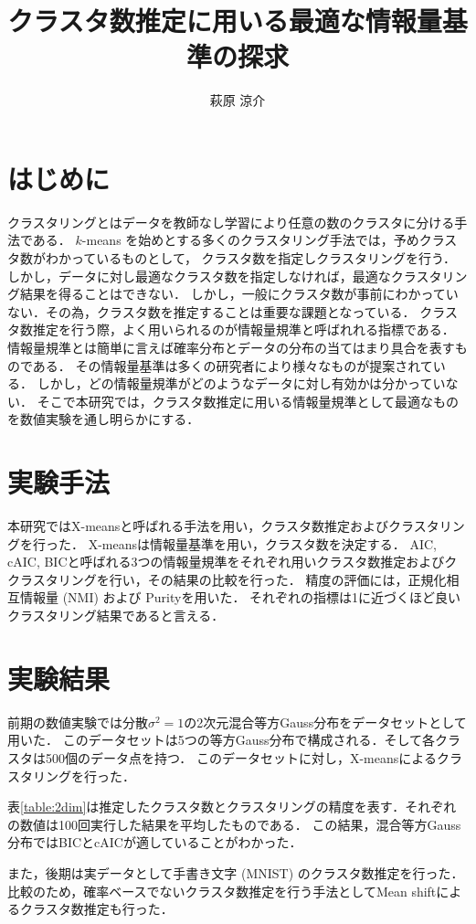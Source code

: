 \documentclass[twocolumn, 10.5pt,a4j]{ltjsarticle}
\author{萩原 涼介}
\title{クラスタ数推定に用いる最適な情報量基準の探求}
\def\tableref#1{表\ref{#1}}
\begin{document}
\maketitle

\section{はじめに}

クラスタリングとはデータを教師なし学習により任意の数のクラスタに分ける手法である．
$k$-means を始めとする多くのクラスタリング手法では，予めクラスタ数がわかっているものとして，
クラスタ数を指定しクラスタリングを行う．しかし，データに対し最適なクラスタ数を指定しなければ，最適なクラスタリング結果を得ることはできない．
しかし，一般にクラスタ数が事前にわかっていない．その為，クラスタ数を推定することは重要な課題となっている．
クラスタ数推定を行う際，よく用いられるのが情報量規準と呼ばれれる指標である．
情報量規準とは簡単に言えば確率分布とデータの分布の当てはまり具合を表すものである．
その情報量基準は多くの研究者により様々なものが提案されている．
しかし，どの情報量規準がどのようなデータに対し有効かは分かっていない．
そこで本研究では，クラスタ数推定に用いる情報量規準として最適なものを数値実験を通し明らかにする．

\section{実験手法}
本研究ではX-meansと呼ばれる手法を用い，クラスタ数推定およびクラスタリングを行った．
X-meansは情報量基準を用い，クラスタ数を決定する．
AIC, cAIC, BICと呼ばれる3つの情報量規準をそれぞれ用いクラスタ数推定およびククラスタリングを行い，その結果の比較を行った．
精度の評価には，正規化相互情報量 (NMI) および Purityを用いた．
それぞれの指標は1に近づくほど良いクラスタリング結果であると言える．

\section{実験結果}
前期の数値実験では分散$\sigma^2 = 1$の2次元混合等方Gauss分布をデータセットとして用いた．
このデータセットは5つの等方Gauss分布で構成される．そして各クラスタは500個のデータ点を持つ．
このデータセットに対し，X-meansによるクラスタリングを行った．

\tableref{table:2dim}は推定したクラスタ数とクラスタリングの精度を表す．それぞれの数値は100回実行した結果を平均したものである．
この結果，混合等方Gauss分布ではBICとcAICが適していることがわかった．

また，後期は実データとして手書き文字 (MNIST) のクラスタ数推定を行った．
比較のため，確率ベースでないクラスタ数推定を行う手法としてMean shiftによるクラスタ数推定も行った．
\end{document}

